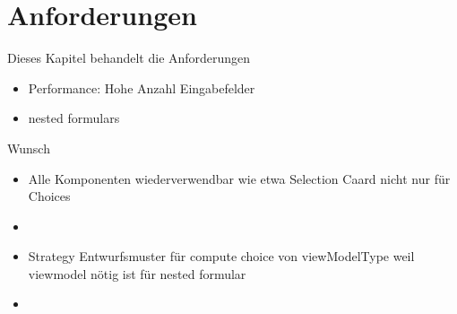 \chapter{Anforderungen}

Dieses Kapitel behandelt die Anforderungen

\begin{itemize}
    \item Performance: Hohe Anzahl Eingabefelder
    \item nested formulars
\end{itemize}


Wunsch
\begin{itemize}
	\item Alle Komponenten wiederverwendbar wie etwa Selection Caard nicht nur für Choices
	\item 
\end{itemize}

\begin{itemize}
	\item Strategy Entwurfsmuster für compute choice von viewModelType weil viewmodel nötig ist für nested formular
	\item 
\end{itemize}